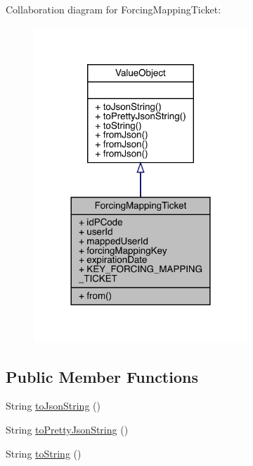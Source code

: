 Collaboration diagram for Forcing\+Mapping\+Ticket\+:
\nopagebreak
\begin{figure}[H]
\begin{center}
\leavevmode
\includegraphics[width=228pt]{classcom_1_1toast_1_1android_1_1gamebase_1_1auth_1_1mapping_1_1data_1_1_forcing_mapping_ticket__coll__graph}
\end{center}
\end{figure}
\subsection*{Public Member Functions}
\begin{DoxyCompactItemize}
\item 
String \hyperlink{classcom_1_1toast_1_1android_1_1gamebase_1_1base_1_1_value_object_a58acf6402880e9769d79d8667581fa6a}{to\+Json\+String} ()
\item 
String \hyperlink{classcom_1_1toast_1_1android_1_1gamebase_1_1base_1_1_value_object_a054431f3d988a22295cfc8b784ff2637}{to\+Pretty\+Json\+String} ()
\item 
String \hyperlink{classcom_1_1toast_1_1android_1_1gamebase_1_1base_1_1_value_object_ad146fa8579a5f8a876c4688cc5a68520}{to\+String} ()
\end{DoxyCompactItemize}
